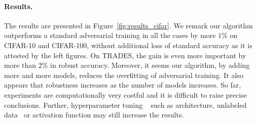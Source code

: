 \paragraph{Results.} The results are presented in Figure~\ref{fig:results_cifar}. We remark our algorithm outperforms a standard adversarial training in all the cases by more $1\%$ on CIFAR-10 and CIFAR-100, without additional loss of standard accuracy as it is attested by the left figures. On TRADES, the gain is even more important by more than $2\%$ in robust accuracy. Moreover, it seems our algorithm, by adding more and more models, reduces the overfitting of adversarial training. It also appears that robustness increases as the number of models increases. So far, experiments are computationally very costful and it is difficult to raise precise conclusions. Further, hyperparameter tuning ~\citep{gowal2020uncovering} such as architecture, unlabeled data~\citep{carmon2019unlabeled} or activation function may still increase the results.








  
